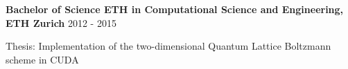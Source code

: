 \textbf{Bachelor of Science ETH in Computational Science and Engineering, ETH Zurich} \hfill 2012 - 2015

Thesis: Implementation of the two-dimensional Quantum Lattice Boltzmann scheme in CUDA
